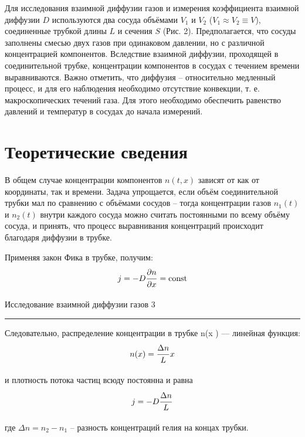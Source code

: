 \documentclass[12pt,a4paper]{scrartcl}
\begin{document}
	 \medskip
	 Для исследования взаимной диффузии газов и	измерения коэффициента взаимной диффузии $D$ используются два сосуда объёмами $V_1$ и $V_2$ ($V_1 \approx V_2 \equiv V$), соединенные трубкой длины $L$ и сечения $S$ (Рис. 2). Предполагается, что сосуды заполнены смесью двух газов при одинаковом давлении, но с различной концентрацией компонентов. Вследствие взаимной диффузии, проходящей в соединительной трубке, концентрации компонентов в сосудах с течением времени выравниваются. Важно отметить, что диффузия -- относительно медленный процесс, и для его наблюдения необходимо отсутствие конвекции, т. е. макроскопических течений газа. Для этого необходимо обеспечить равенство давлений и температур в сосудах до начала измерений.

	
	\section{Теоретические сведения}
	
	В общем случае концентрации компонентов $n(t, x)$ зависят от как от координаты, так и времени. Задача упрощается, если объём соединительной трубки мал по
	сравнению с объёмами сосудов -- тогда концентрации газов $n_1(t)$ и $n_2(t)$ внутри каждого сосуда можно считать	постоянными по всему объёму сосуда, и принять, что процесс выравнивания концентраций происходит благодаря диффузии в трубке.
	
	Применяя закон Фика в трубке, получим:
	$$j = - D \dfrac{\strut \partial n}{\strut \partial x} = \mathrm{const}$$
	
	
	\newpage
	
	\begin{flushleft}
		\footnotesize{Исследование взаимной диффузии газов} \hspace{\fill} \footnotesize{3}
		\\[-0.3cm]\noindent\rule{\textwidth}{0.3pt}
	\end{flushleft}

	Следовательно, распределение концентрации в трубке n(x ) — линейная
	функция:
	$$n(x) = \dfrac{\strut \Delta n}{\strut L}x$$
	
	и плотность потока частиц всюду постоянна и равна
	$$j = -D\dfrac{\strut \Delta n}{\strut L}$$
	
	где $\Delta n = n_2 - n_1$ -- разность концентраций гелия на концах трубки.
	
\end{document}
